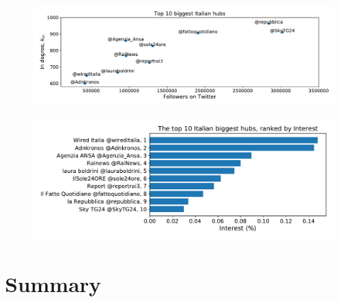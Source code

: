 \documentclass[11pt, twoside]{report}
\begin{document}
    \begin{figure}[htbp]
      \centering
      \includegraphics[width=\textwidth]{../../scripts/network_analysis/imgs/hubs_followers_ita.pdf}            
      \caption{}
      \label{fig:hubs_followers_ita}
    \end{figure}

    \begin{figure}[htbp]
      \centering
      \includegraphics[width=\textwidth]{../../scripts/network_analysis/imgs/hubs_interest_ita.pdf}            
      \caption{}
      \label{fig:hubs_followers_ita}
    \end{figure}

    


    

    

    

    \chapter{Summary}


\printbibliography[title={References}]
\end{document}
